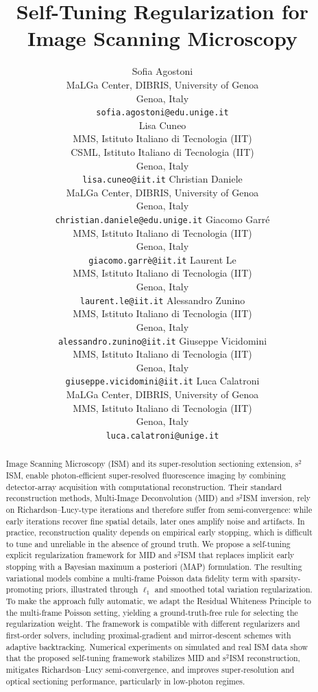 \documentclass[letterpaper]{article}
\title{Self-Tuning Regularization for Image Scanning Microscopy}
\date{} 					%
\author{
	{Sofia Agostoni} \\
	MaLGa Center, DIBRIS, University of Genoa\\
	Genoa, Italy \\
	\texttt{sofia.agostoni@edu.unige.it} \\
	\And
	{Lisa Cuneo} \\
	MMS, Istituto Italiano di Tecnologia (IIT)\\
    CSML, Istituto Italiano di Tecnologia (IIT)\\
	Genoa, Italy \\
    \texttt{lisa.cuneo@iit.it}
	\And
	{Christian Daniele} \\
	MaLGa Center, DIBRIS, University of Genoa\\
	Genoa, Italy \\
    \texttt{christian.daniele@edu.unige.it}
	\And
	{Giacomo Garré} \\
	MMS, Istituto Italiano di Tecnologia (IIT)\\
	Genoa, Italy \\
    \texttt{giacomo.garrè@iit.it}
	\And
	{Laurent Le} \\
	MMS, Istituto Italiano di Tecnologia (IIT)\\
	Genoa, Italy \\
    \texttt{laurent.le@iit.it}
	\And
	{Alessandro Zunino} \\
	MMS, Istituto Italiano di Tecnologia (IIT)\\
	Genoa, Italy \\
    \texttt{alessandro.zunino@iit.it}
	\And
	{Giuseppe Vicidomini} \\
	MMS, Istituto Italiano di Tecnologia (IIT)\\
	Genoa, Italy \\
    \texttt{giuseppe.vicidomini@iit.it}
	\And
	{Luca Calatroni} \\
	MaLGa Center, DIBRIS, University of Genoa\\
	MMS, Istituto Italiano di Tecnologia (IIT)\\
	Genoa, Italy \\
    \texttt{luca.calatroni@unige.it}
}
\renewcommand{\shorttitle}{\textit{arXiv} preprint}
\begin{document}
\let\WriteBookmarks\relax
\def\floatpagepagefraction{1}
\def\textpagefraction{.001}






\maketitle



\begin{abstract}
Image Scanning Microscopy (ISM) and its super-resolution sectioning extension, s$^2$ISM, enable photon-efficient super-resolved fluorescence imaging by combining detector-array acquisition with computational reconstruction. Their standard reconstruction methods, Multi-Image Deconvolution (MID) and s$^2$ISM inversion, rely on Richardson–Lucy-type iterations and therefore suffer from semi-convergence: while early iterations recover fine spatial details, later ones amplify noise and artifacts. In practice, reconstruction quality depends on empirical early stopping, which is difficult to tune and unreliable in the absence of ground truth. We propose a self-tuning explicit regularization framework for MID and s$^2$ISM that replaces implicit early stopping with a Bayesian maximum a posteriori (MAP) formulation. The resulting variational models combine a multi-frame Poisson data fidelity term with sparsity-promoting priors, illustrated through $\ell_1$ and smoothed total variation regularization. To make the approach fully automatic, we adapt the Residual Whiteness Principle to the multi-frame Poisson setting, yielding a ground-truth-free rule for selecting the regularization weight. The framework is compatible with different regularizers and first-order solvers, including proximal-gradient and mirror-descent schemes with adaptive backtracking. Numerical experiments on simulated and real ISM data show that the proposed self-tuning framework stabilizes MID and s$^2$ISM reconstruction, mitigates Richardson–Lucy semi-convergence, and improves super-resolution and optical sectioning performance, particularly in low-photon regimes.
\end{abstract}
\end{document}
